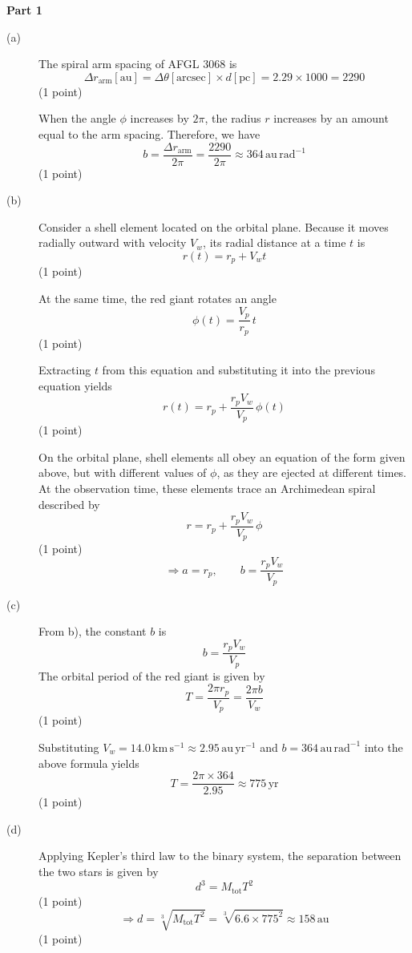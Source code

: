 \noindent\textbf{Part 1}
\begin{description}
\item[(a)] The spiral arm spacing of AFGL 3068 is
  \[ \Delta r_{\mathrm{arm}}[\mathrm{au}]
     = \Delta\theta[\mathrm{arcsec}] \times d[\mathrm{pc}]
     = 2.29 \times 1000 = 2290 \]
  \hfill(1 point)

  When the angle $\phi$ increases by $2\pi$, the radius $r$ increases by an
  amount equal to the arm spacing. Therefore, we have
  \[ b = \frac{\Delta r_{\mathrm{arm}}}{2\pi} = \frac{2290}{2\pi}
     \approx 364\,\mathrm{au\,rad^{-1}} \]
  \hfill(1 point)

\item[(b)] Consider a shell element located on the orbital plane. Because it
  moves radially outward with velocity $V_w$, its radial distance at a time
  $t$ is
  \[ r(t) = r_p + V_w t \]
  \hfill(1 point)

  At the same time, the red giant rotates an angle
  \[ \phi(t) = \frac{V_p}{r_p}\,t \]
  \hfill(1 point)

  Extracting $t$ from this equation and substituting it into the previous
  equation yields
  \[ r(t) = r_p + \frac{r_p V_w}{V_p}\,\phi(t) \]
  \hfill(1 point)

  On the orbital plane, shell elements all obey an equation of the form given
  above, but with different values of $\phi$, as they are ejected at different
  times. At the observation time, these elements trace an Archimedean spiral
  described by
  \[ r = r_p + \frac{r_p V_w}{V_p}\,\phi \]
  \hfill(1 point)
  \[ \Longrightarrow a = r_p, \qquad b = \frac{r_p V_w}{V_p} \]

\item[(c)] From b), the constant $b$ is
  \[ b = \frac{r_p V_w}{V_p} \]
  The orbital period of the red giant is given by
  \[ T = \frac{2\pi r_p}{V_p} = \frac{2\pi b}{V_w} \]
  \hfill(1 point)

  Substituting $V_w = 14.0\,\mathrm{km\,s^{-1}} \approx
  2.95\,\mathrm{au\,yr^{-1}}$ and $b = 364\,\mathrm{au\,rad^{-1}}$ into the
  above formula yields
  \[ T = \frac{2\pi \times 364}{2.95} \approx 775\,\mathrm{yr} \]
  \hfill(1 point)

\item[(d)] Applying Kepler's third law to the binary system, the separation
  between the two stars is given by
  \[ d^3 = M_{\mathrm{tot}} T^2 \]
  \hfill(1 point)
  \[ \Rightarrow d = \sqrt[3]{M_{\mathrm{tot}} T^2}
     = \sqrt[3]{6.6 \times 775^2} \approx 158\,\mathrm{au} \]
  \hfill(1 point)
\end{description}

